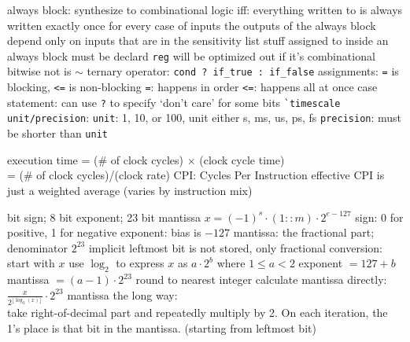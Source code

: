 \documentclass[12pt]{article}
\begin{document}
\begin{spacing}{0.8}
\begin{multicols*}{2}
\begin{flushleft}
\begin{outline}[longenum]

  \1 always block: synthesize to combinational logic iff:
    \2 everything written to is always written exactly once for every case of inputs
    \2 the outputs of the always block depend only on inputs that are in the sensitivity list
    \2 stuff assigned to inside an always block must be declard \verb|reg|
      \3 will be optimized out if it's combinational
  \1 bitwise not is $\sim$
  \1 ternary operator: \verb|cond ? if_true : if_false|
  \1 assignments: \verb|=| is blocking, \verb|<=| is non-blocking
    \2 \verb|=|: happens in order
    \2 \verb|<=|: happens all at once
  \1 case statement: can use \verb|?| to specify `don't care' for some bits
  \1 \verb|`timescale unit/precision|:
    \2 \verb|unit|: 1, 10, or 100, unit either s, ms, us, ps, fs
    \2 \verb|precision|: must be shorter than \verb|unit|

  \1 execution time = (\# of clock cycles) $\times$ (clock cycle time)
    \\ = (\# of clock cycles)/(clock rate) 
  \1 CPI: Cycles Per Instruction
    \2 effective CPI is just a weighted average (varies by instruction mix)

   bit sign; 8 bit exponent; 23 bit mantissa
    \2 $x = (-1)^s \cdot (1::m) \cdot 2^{e-127}$
  \1 sign: 0 for positive, 1 for negative
  \1 exponent: bias is $-127$
  \1 mantissa: the fractional part; denominator $2^{23}$
    \2 implicit leftmost bit is not stored, only fractional
  \1 conversion:
    \2 start with $x$
    \2 use $\log_2$ to express $x$ as $a \cdot 2^b$ where $1\leq a < 2$
    \2 exponent $=127+b$
    \2 mantissa $=(a-1) \cdot 2^{23}$
      \3 round to nearest integer
  \1 calculate mantissa directly: $\frac{x}{2^{\lfloor \log_2(x) \rfloor}} \cdot 2^{23}$
  \1 mantissa the long way:
    \\ take right-of-decimal part and repeatedly multiply by 2. On each iteration, the 1's place is that bit in the mantissa. (starting from leftmost bit)
    
\end{outline}
\end{flushleft}
\end{multicols*}
\end{spacing}
\end{document}
